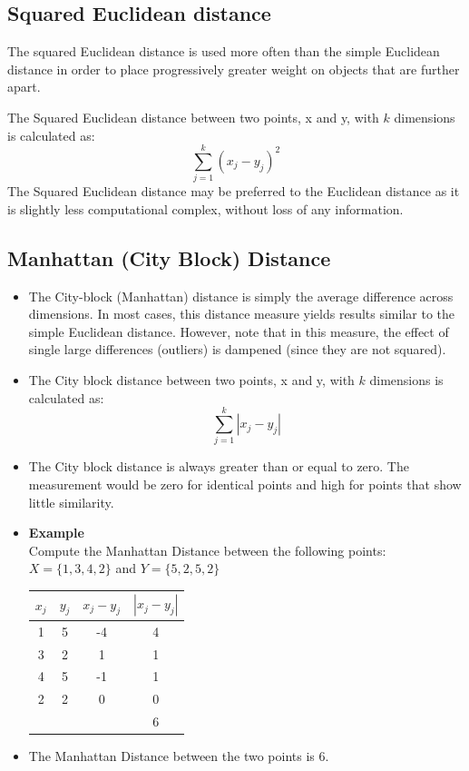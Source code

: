\documentclass[a4paper,12pt]{report}
\begin{document}
\subsection{Squared Euclidean distance}


The squared Euclidean distance is used more often than the simple Euclidean distance in order to place progressively greater weight on objects that are further apart. 


The Squared Euclidean distance between two points, x and y, with $k$ dimensions is calculated as:
\[ \sum^{k}_{j=1} ( x_j - y_j)^2  \]
The Squared Euclidean distance may be preferred to the Euclidean distance as it is slightly less computational complex, without loss of any information.




\subsection{Manhattan (City Block) Distance}
\begin{itemize}
\item The City-block (Manhattan) distance is simply the average difference across dimensions. In most cases, this distance measure yields results similar to the simple Euclidean distance. However, note that in this measure, the effect of single large differences (outliers) is dampened (since they are not squared). 


\item 
The City block distance between two points, x and y, with $k$ dimensions is calculated as:
\[ \sum^{k}_{j=1} | x_j - y_j |  \]

\item The City block distance is always greater than or equal to zero. The measurement would be zero for identical points and high for points that show little similarity.

\item  \textbf{Example}\\
Compute the Manhattan Distance between the following points: 
$X = \{1,3,4,2\}$ and $Y = \{5,2,5,2\}$


\begin{center}
	\begin{tabular}{|c|c|c|c|}
		\hline
		$x_j$	&	$y_j$	&   $x_j - y_j$	&	$| x_j - y_j |$	\\ \hline
		1	&	5	&	-4	&	4	\\
		3	&	2	&	1	&	1	\\
		4	&	5	&	-1	&	1	\\
		2	&	2	&	0	&	0	\\ \hline
		& & & 6 \\
		\hline
	\end{tabular}
\end{center}
\item The Manhattan Distance between the two points is 6.
\end{itemize}
\end{document}
